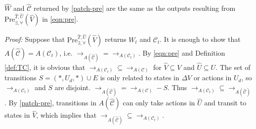 \begin{theorem}
	$ \widehat{W} $ and $ \widehat{\mathcal{C}} $ returned by \eqref{patch-pre} are the same as the outputs resulting from $ \text{Pre}_{\exists,\forall}^{\widehat{T},\widehat{U}}(\widehat{V})$ in \eqref{eqn:pre}.	\label{thm:pre}
\end{theorem}

\emph{Proof:} Suppose that $ \text{Pre}_{\exists,\forall}^{\widehat{T},\widehat{U}}(\widehat{V}) $ returns $ W_t $ and $ \mathcal{C}_t $. It is enough to show that $ A(\widehat{\mathcal{C}})= A(\mathcal{C}_t)$, i.e. $ \rightarrow_{A(\widehat{\mathcal{C}})} = \rightarrow_{A(\mathcal{C}_t)} $. By \eqref{eqn:pre} and Definition \ref{def:TC}, it is obvious that $ \rightarrow_{A(\mathcal{C}_t)} \subseteq \rightarrow_{A(\mathcal{C})}$ for $ \widehat{V}\subseteq V $ and $ \widehat{U}\subseteq U $. The set of transitions $ S = (*,U_d,*)\cup E $ is only related to states in $ \Delta V $ or actions in $ U_d $, so $\rightarrow_{A(\mathcal{C}_t)}$ and $ S $ are disjoint. $ \rightarrow_{A(\widehat{\mathcal{C}})}= \rightarrow_{A(\mathcal{C})}-S$. Thus $ \rightarrow_{A(\mathcal{C}_t)}\subseteq \rightarrow_{A(\widehat{\mathcal{C}})}$. By \eqref{patch-pre}, transitions in $ A(\widehat{\mathcal{C}}) $ can only take actions in $ \widehat{U} $ and transit to states in $ \widehat{V} $, which implies that $ \rightarrow_{A(\widehat{\mathcal{C}})}\subseteq \rightarrow_{A(\mathcal{C}_t)} $. \QEDB 


